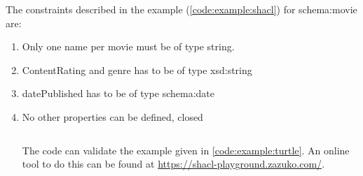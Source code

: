 The constraints described in the  example (\autoref{code:example:shacl})  for schema:movie are:
\begin{enumerate}
    \item Only one name per movie must be of type string.
    \item ContentRating and genre has to be of type xsd:string
    \item datePublished has to be of type schema:date
    \item No other properties can be defined, closed
\begin{listing}[H]
   \inputminted[linenos,frame=single]{turtle}{code/shacl_example.ttl}
    \caption{The  code can validate the  example given in \autoref{code:example:turtle}. An online tool to do this can be found at \url{https://shacl-playground.zazuko.com/}.}
    \label{code: example:shacl}
\end{listing}


    
\end{enumerate}

